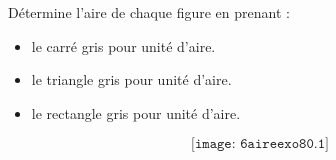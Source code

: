 Détermine l'aire de chaque figure en prenant :
\begin{itemize}
	\item le carré gris pour unité d'aire.
	\item le triangle gris pour unité d'aire. 
	\item le rectangle gris pour unité d'aire.
\end{itemize}
\[\texttt{[image: 6aireexo80.1]}\] 